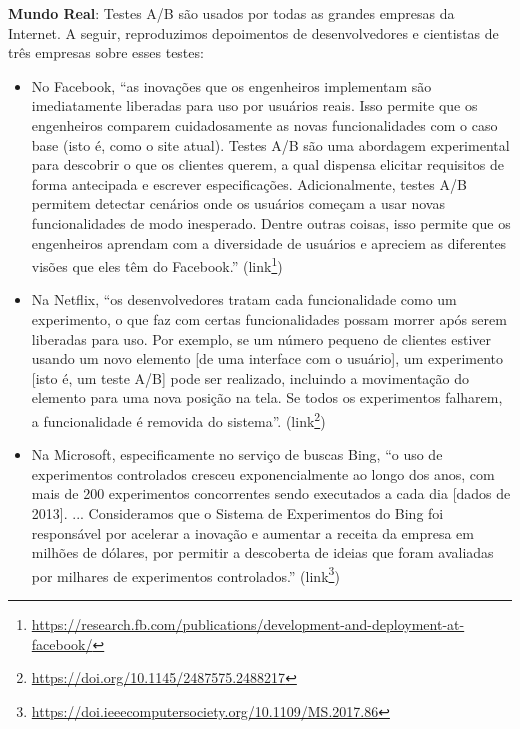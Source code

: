 \documentclass[
  11pt,
  twoside]{book}
\DeclareRobustCommand{\href}[2]{#2\footnote{\url{#1}}}
\newenvironment{esmbox}{\centering \vspace{1.5ex} \begin{tcolorbox}[breakable, colback=backcolor, width=4.9in]}{\end{tcolorbox} \vspace{1.5ex}}
\begin{document}
\begin{esmbox}

\textbf{Mundo Real}: Testes A/B são usados por todas as grandes empresas
da Internet. A seguir, reproduzimos depoimentos de desenvolvedores e
cientistas de três empresas sobre esses testes:

\begin{itemize}
\item
  No Facebook,  ``as inovações que os engenheiros
  implementam são imediatamente liberadas para uso por usuários reais.
  Isso permite que os engenheiros comparem cuidadosamente as novas
  funcionalidades com o caso base (isto é, como o site atual). Testes
  A/B são uma abordagem experimental para descobrir o que os clientes
  querem, a qual dispensa elicitar requisitos de forma antecipada e
  escrever especificações. Adicionalmente, testes A/B permitem detectar
  cenários onde os usuários começam a usar novas funcionalidades de modo
  inesperado. Dentre outras coisas, isso permite que os engenheiros
  aprendam com a diversidade de usuários e apreciem as diferentes visões
  que eles têm do Facebook.''
  (\href{https://research.fb.com/publications/development-and-deployment-at-facebook/}{link})
\item
  Na Netflix,  ``os desenvolvedores tratam cada
  funcionalidade como um experimento, o que faz com certas
  funcionalidades possam morrer após serem liberadas para uso. Por
  exemplo, se um número pequeno de clientes estiver usando um novo
  elemento {[}de uma interface com o usuário{]}, um experimento {[}isto
  é, um teste A/B{]} pode ser realizado, incluindo a movimentação do
  elemento para uma nova posição na tela. Se todos os experimentos
  falharem, a funcionalidade é removida do sistema''.
  (\href{https://doi.org/10.1145/2487575.2488217}{link})
\item
  Na Microsoft,  especificamente no serviço de buscas
  Bing, ``o uso de experimentos controlados cresceu exponencialmente ao
  longo dos anos, com mais de 200 experimentos concorrentes sendo
  executados a cada dia {[}dados de 2013{]}. ... Consideramos que o
  Sistema de Experimentos do Bing foi responsável por acelerar a
  inovação e aumentar a receita da empresa em milhões de dólares, por
  permitir a descoberta de ideias que foram avaliadas por milhares de
  experimentos controlados.''
  (\href{https://doi.ieeecomputersociety.org/10.1109/MS.2017.86}{link})
\end{itemize}

\end{esmbox}
\end{document}
